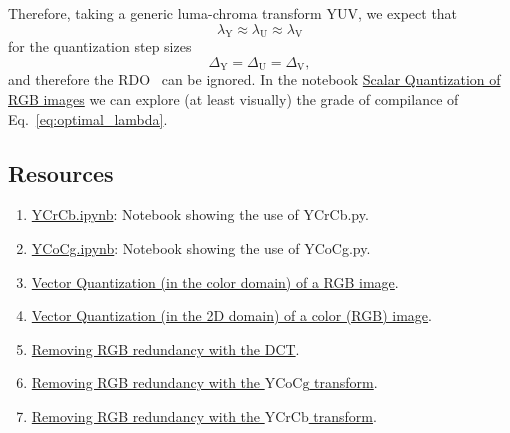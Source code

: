 Therefore, taking a generic luma-chroma transform $\text{YUV}$, we
expect that
\begin{equation}
  \lambda_{\text{Y}} \approx \lambda_{\text{U}} \approx \lambda_{\text{V}}
  \label{eq:optimal_lambda}
\end{equation}
for the quantization step sizes
\begin{equation}
  \Delta_{\text{Y}} = \Delta_{\text{U}} = \Delta_{\text{V}},
  \label{eq:optimal_delta}
\end{equation}
and therefore the RDO~\cite{vruiz__information_theory} can be
ignored. In the notebook
\href{https://github.com/Sistemas-Multimedia/Sistemas-Multimedia.github.io/blob/master/contents/RGB_SQ/RGB_SQ.ipynb}{Scalar
  Quantization of RGB images} we can explore (at least visually) the
grade of compilance of Eq.~\eqref{eq:optimal_lambda}.

\subsection*{Resources}
\begin{enumerate}
\item \href{https://github.com/Sistemas-Multimedia/VCF/blob/main/notebooks/YCrCb.ipynb}{YCrCb.ipynb}: Notebook showing the use of YCrCb.py.
\item \href{https://github.com/Sistemas-Multimedia/VCF/blob/main/notebooks/YCoCg.ipynb}{YCoCg.ipynb}: Notebook showing the use of YCoCg.py.
\item \href{https://github.com/vicente-gonzalez-ruiz/vector_quantization/blob/main/docs/RGB_VQ.ipynb}{Vector
    Quantization (in the color domain) of a RGB image}.
\item \href{https://github.com/vicente-gonzalez-ruiz/vector_quantization/blob/main/docs/spatial_color_VQ.ipynb}{Vector
  Quantization (in the 2D domain) of a color (RGB) image}.
\item \href{https://github.com/vicente-gonzalez-ruiz/color_transforms/blob/main/docs/3DCT/3DCT_over_RGB.ipynb}{Removing RGB redundancy with the DCT}.
\item \href{https://github.com/vicente-gonzalez-ruiz/color_transforms/blob/main/docs/YCoCg/YCoCg_over_RGB.ipynb}{Removing RGB redundancy with the $\text{YCoCg}$ transform}.
\item \href{https://github.com/vicente-gonzalez-ruiz/color_transforms/blob/main/docs/YCrCb/YCrCb_over_RGB.ipynb}{Removing RGB redundancy with the $\text{YCrCb}$ transform}.
\end{enumerate}
  
